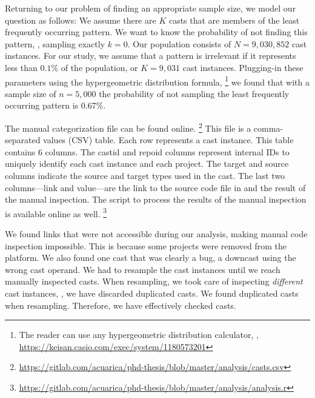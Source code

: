 Returning to our problem of finding an appropriate sample size, we model our question as follows:
We assume there are $K$ casts that are members of the least frequently occurring pattern.
We want to know the probability of not finding this pattern, \ie, sampling exactly $k = 0$.
Our population consists of $N = 9,030,852$ cast instances.
For our study, we assume that a pattern is irrelevant if it represents less than $0.1\%$ of the population, or $K = 9,031$ cast instances.
Plugging-in these parameters using the hypergeometric distribution formula,%
\footnote{The reader can use any hypergeometric distribution calculator, \eg{}, \url{https://keisan.casio.com/exec/system/1180573201}}
we found that with a sample size of $n = 5,000$ the probability of not sampling the
least frequently occurring pattern is $0.67\%$.

\newcommand\col[1]{\textsf{#1}}
The manual categorization file can be found online.%
\footnote{\url{https://gitlab.com/acuarica/phd-thesis/blob/master/analysis/casts.csv}}
This file is a comma-separated values (CSV) table.
Each row represents a cast instance.
This table contains 6 columns.
The \col{castid} and \col{repoid} columns represent internal IDs to uniquely identify each cast instance and each project.
The \col{target} and \col{source} columns indicate the source and target types used in the cast.
The last two columns---\col{link} and \col{value}---are the link to the source code file in \lgtm{} and the result of the manual inspection.
The script to process the results of the manual inspection is available online as well.%
\footnote{\url{https://gitlab.com/acuarica/phd-thesis/blob/master/analysis/analysis.r}}

We found \nBrokenLink{} links that were not accessible during our analysis,
making manual code inspection impossible.
This is because some projects were removed from the \lgtm{} platform.
We also found one cast that was clearly a bug,
a downcast using the wrong cast operand.
We had to resample the cast instances until we reach \nSize{} manually inspected casts.
When resampling, we took care of inspecting \emph{different} cast instances, \ie,
we have discarded duplicated casts.
We found \nDuplicated{} duplicated casts when resampling.
Therefore, we have effectively checked \nSeen{} casts.
